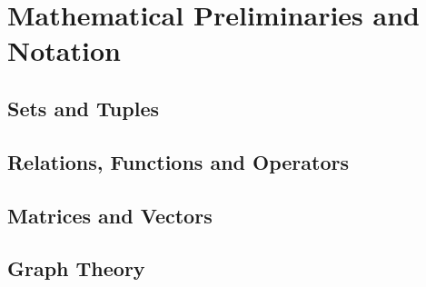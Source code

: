\chapter{Mathematical Preliminaries and Notation}

\section{Sets and Tuples}

\section{Relations, Functions and Operators}

\section{Matrices and Vectors}

\section{Graph Theory}